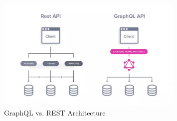 \begin{figure}[htbp] %
      \centering
      \includegraphics[width=0.8\textwidth]{Figures/graphql.jpg}
      \caption{GraphQL vs. REST Architecture}
      \label{fig:graphqlvsrestarchitecture}
\end{figure}
